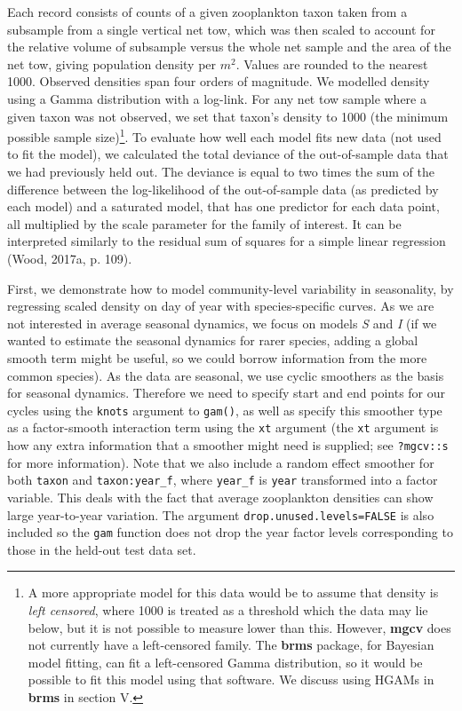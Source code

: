 \documentclass[12pt]{article}
\let\rmarkdownfootnote\footnote%
\def\footnote{\protect\rmarkdownfootnote}
\begin{document}
Each record consists of counts of a given zooplankton taxon taken from a
subsample from a single vertical net tow, which was then scaled to
account for the relative volume of subsample versus the whole net sample
and the area of the net tow, giving population density per \(m^2\).
Values are rounded to the nearest 1000. Observed densities span four
orders of magnitude. We modelled density using a Gamma distribution with
a log-link. For any net tow sample where a given taxon was not observed,
we set that taxon's density to 1000 (the minimum possible sample
size)\footnote{A more appropriate model for this data would be to assume
  that density is \emph{left censored}, where 1000 is treated as a
  threshold which the data may lie below, but it is not possible to
  measure lower than this. However, \textbf{mgcv} does not currently
  have a left-censored family. The \textbf{brms} package, for Bayesian
  model fitting, can fit a left-censored Gamma distribution, so it would
  be possible to fit this model using that software. We discuss using
  HGAMs in \textbf{brms} in section V.}. To evaluate how well each model
fits new data (not used to fit the model), we calculated the total
deviance of the out-of-sample data that we had previously held out. The
deviance is equal to two times the sum of the difference between the
log-likelihood of the out-of-sample data (as predicted by each model)
and a saturated model, that has one predictor for each data point, all
multiplied by the scale parameter for the family of interest. It can be
interpreted similarly to the residual sum of squares for a simple linear
regression (Wood, 2017a, p. 109).

First, we demonstrate how to model community-level variability in
seasonality, by regressing scaled density on day of year with
species-specific curves. As we are not interested in average seasonal
dynamics, we focus on models \emph{S} and \emph{I} (if we wanted to
estimate the seasonal dynamics for rarer species, adding a global smooth
term might be useful, so we could borrow information from the more
common species). As the data are seasonal, we use cyclic smoothers as
the basis for seasonal dynamics. Therefore we need to specify start and
end points for our cycles using the \texttt{knots} argument to
\texttt{gam()}, as well as specify this smoother type as a factor-smooth
interaction term using the \texttt{xt} argument (the \texttt{xt}
argument is how any extra information that a smoother might need is
supplied; see \texttt{?mgcv::s} for more information). Note that we also
include a random effect smoother for both \texttt{taxon} and
\texttt{taxon:year\_f}, where \texttt{year\_f} is \texttt{year}
transformed into a factor variable. This deals with the fact that
average zooplankton densities can show large year-to-year variation. The
argument \texttt{drop.unused.levels=FALSE} is also included so the
\texttt{gam} function does not drop the year factor levels corresponding
to those in the held-out test data set.
\end{document}
